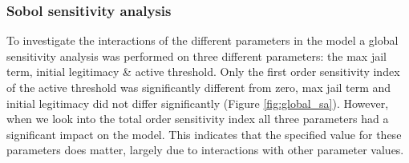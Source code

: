 \documentclass[10pt]{article}
\begin{document}
    \subsubsection{Sobol sensitivity analysis}
    To investigate the interactions of the different parameters in the model a global sensitivity analysis was performed on three different parameters: the max jail term, initial legitimacy \& active threshold. Only the first order sensitivity index of the active threshold was significantly different from zero, max jail term and initial legitimacy did not differ significantly (Figure \ref{fig:global_sa}). However, when we look into the total order sensitivity index all three parameters had a significant impact on the model. This indicates that the specified value for these parameters does matter, largely due to interactions with other parameter values.
\end{document}
